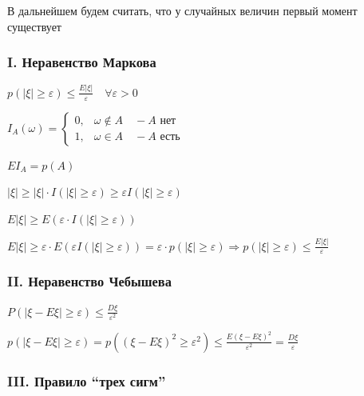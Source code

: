 \documentclass[12pt]{article}
\begin{document}
    В дальнейшем будем считать, что у случайных величин первый момент существует

    \subsubsection{I. Неравенство Маркова}

    \hypertarget{markovsinequality}{}

    \begin{MyTheorem}
        \Ths $p(|\xi| \geq \varepsilon) \leq \frac{E|\xi|}{\varepsilon} \quad \forall \varepsilon > 0$
    \end{MyTheorem}

    \begin{MyProof}
        $I_A(\omega) = \begin{cases}0, & \omega \notin A \quad - A\text{ нет} \\ 1, & \omega \in A \quad - A\text{ есть}\end{cases}$

        $EI_A = p(A)$

        $|\xi| \geq |\xi| \cdot I(|\xi| \geq \varepsilon) \geq \varepsilon I(|\xi| \geq \varepsilon)$

        $E|\xi| \geq E(\varepsilon \cdot I(|\xi| \geq \varepsilon))$

        $E|\xi| \geq \varepsilon \cdot E(\varepsilon I(|\xi| \geq \varepsilon)) = \varepsilon \cdot p(|\xi| \geq \varepsilon) 
        \Longrightarrow p(|\xi| \geq \varepsilon) \leq \frac{E|\xi|}{\varepsilon}$
    \end{MyProof}

    \hypertarget{chebyshevsinequality}{}

    \subsubsection{II. Неравенство Чебышева}

    \begin{MyTheorem}
        \Ths $P(|\xi - E\xi| \geq \varepsilon) \leq \frac{D\xi}{\varepsilon^2}$
    \end{MyTheorem}

    \begin{MyProof}
        $p(|\xi - E\xi| \geq \varepsilon) = p((\xi - E\xi)^2 \geq \varepsilon^2) \leq \frac{E(\xi - E\xi)^2}{\varepsilon^2} = \frac{D\xi}{\varepsilon}$
    \end{MyProof}

    \subsubsection{III. Правило \enquote{трех сигм}}
    
\end{document}
